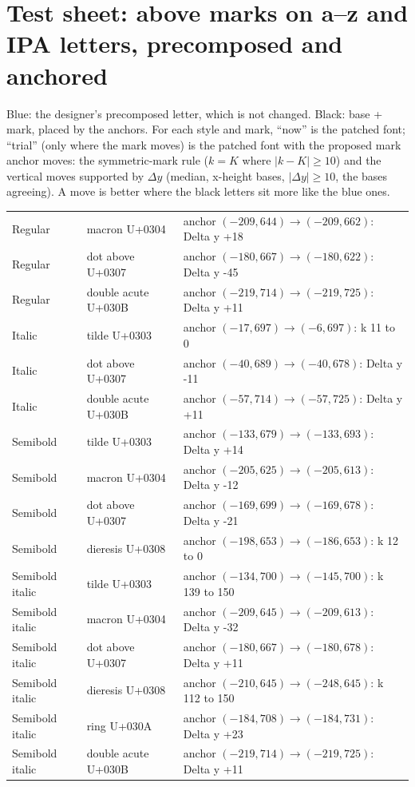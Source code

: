 \documentclass[10pt]{article}
\begin{document}
\section*{Test sheet: above marks on a--z and IPA letters, precomposed and anchored}
{\color{precomposed}Blue}: the designer's precomposed letter, which is not changed.
Black: base + mark, placed by the anchors.
For each style and mark, ``now'' is the patched font; ``trial'' (only where the mark moves) is the patched font with the proposed mark anchor moves:
the symmetric-mark rule ($k = K$ where $|k-K| \ge 10$) and the vertical moves supported by $\Delta y$ (median, x-height bases, $|\Delta y| \ge 10$, the bases agreeing).
A move is better where the black letters sit more like the blue ones.

\medskip
\begin{tabular}{@{}lll@{}}

Regular & macron U+0304 & anchor $(-209, 644) \to (-209, 662)$: Delta y +18\\
Regular & dot above U+0307 & anchor $(-180, 667) \to (-180, 622)$: Delta y -45\\
Regular & double acute U+030B & anchor $(-219, 714) \to (-219, 725)$: Delta y +11\\
Italic & tilde U+0303 & anchor $(-17, 697) \to (-6, 697)$: k 11 to 0\\
Italic & dot above U+0307 & anchor $(-40, 689) \to (-40, 678)$: Delta y -11\\
Italic & double acute U+030B & anchor $(-57, 714) \to (-57, 725)$: Delta y +11\\
Semibold & tilde U+0303 & anchor $(-133, 679) \to (-133, 693)$: Delta y +14\\
Semibold & macron U+0304 & anchor $(-205, 625) \to (-205, 613)$: Delta y -12\\
Semibold & dot above U+0307 & anchor $(-169, 699) \to (-169, 678)$: Delta y -21\\
Semibold & dieresis U+0308 & anchor $(-198, 653) \to (-186, 653)$: k 12 to 0\\
Semibold italic & tilde U+0303 & anchor $(-134, 700) \to (-145, 700)$: k 139 to 150\\
Semibold italic & macron U+0304 & anchor $(-209, 645) \to (-209, 613)$: Delta y -32\\
Semibold italic & dot above U+0307 & anchor $(-180, 667) \to (-180, 678)$: Delta y +11\\
Semibold italic & dieresis U+0308 & anchor $(-210, 645) \to (-248, 645)$: k 112 to 150\\
Semibold italic & ring U+030A & anchor $(-184, 708) \to (-184, 731)$: Delta y +23\\
Semibold italic & double acute U+030B & anchor $(-219, 714) \to (-219, 725)$: Delta y +11\\
\end{tabular}
\end{document}
